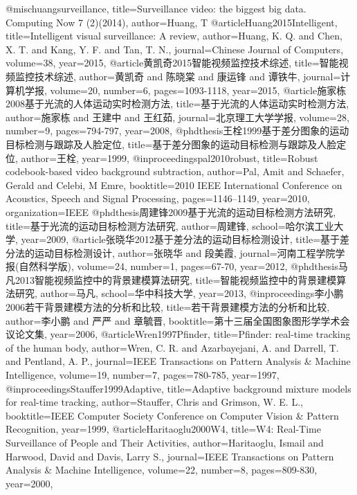 \documentclass[]{article}
\begin{document}
@misc{huangsurveillance,
	title={Surveillance video: the biggest big data. Computing Now 7 (2)(2014)},
	author={Huang, T}
}
@article{Huang2015Intelligent,
	title={Intelligent visual surveillance: A review},
	author={Huang, K. Q. and Chen, X. T. and Kang, Y. F. and Tan, T. N.},
	journal={Chinese Journal of Computers},
	volume={38},
	year={2015},
}
@article{黄凯奇2015智能视频监控技术综述,
	title={智能视频监控技术综述},
	author={黄凯奇 and 陈晓棠 and 康运锋 and 谭铁牛},
	journal={计算机学报},
	volume={20},
	number={6},
	pages={1093-1118},
	year={2015},
}
@article{施家栋2008基于光流的人体运动实时检测方法,
	title={基于光流的人体运动实时检测方法},
	author={施家栋 and 王建中 and 王红茹},
	journal={北京理工大学学报},
	volume={28},
	number={9},
	pages={794-797},
	year={2008},
}
@phdthesis{王栓1999基于差分图象的运动目标检测与跟踪及人脸定位,
	title={基于差分图象的运动目标检测与跟踪及人脸定位},
	author={王栓},
	year={1999},
}
@inproceedings{pal2010robust,
	title={Robust codebook-based video background subtraction},
	author={Pal, Amit and Schaefer, Gerald and Celebi, M Emre},
	booktitle={2010 IEEE International Conference on Acoustics, Speech and Signal Processing},
	pages={1146--1149},
	year={2010},
	organization={IEEE}
}
@phdthesis{周建锋2009基于光流的运动目标检测方法研究,
	title={基于光流的运动目标检测方法研究},
	author={周建锋},
	school={哈尔滨工业大学},
	year={2009},
}
@article{张晓华2012基于差分法的运动目标检测设计,
	title={基于差分法的运动目标检测设计},
	author={张晓华 and 段美霞},
	journal={河南工程学院学报(自然科学版)},
	volume={24},
	number={1},
	pages={67-70},
	year={2012},
}
@phdthesis{马凡2013智能视频监控中的背景建模算法研究,
	title={智能视频监控中的背景建模算法研究},
	author={马凡},
	school={华中科技大学},
	year={2013},
}
@inproceedings{李小鹏2006若干背景建模方法的分析和比较,
	title={若干背景建模方法的分析和比较},
	author={李小鹏 and 严严 and 章毓晋},
	booktitle={第十三届全国图象图形学学术会议论文集},
	year={2006},
}
@article{Wren1997Pfinder,
	title={Pfinder: real-time tracking of the human body},
	author={Wren, C. R. and Azarbayejani, A. and Darrell, T. and Pentland, A. P.},
	journal={IEEE Transactions on Pattern Analysis & Machine Intelligence},
	volume={19},
	number={7},
	pages={780-785},
	year={1997},
}
@inproceedings{Stauffer1999Adaptive,
	title={Adaptive background mixture models for real-time tracking},
	author={Stauffer, Chris and Grimson, W. E. L.},
	booktitle={IEEE Computer Society Conference on Computer Vision & Pattern Recognition},
	year={1999},
}
@article{Haritaoglu2000W4,
	title={W4: Real-Time Surveillance of People and Their Activities},
	author={Haritaoglu, Ismail and Harwood, David and Davis, Larry S.},
	journal={IEEE Transactions on Pattern Analysis & Machine Intelligence},
	volume={22},
	number={8},
	pages={809-830},
	year={2000},
}
\end{document}
